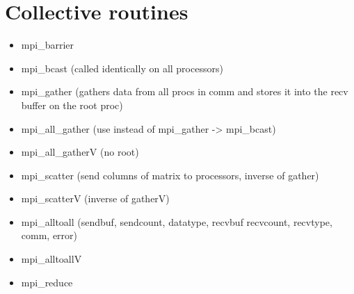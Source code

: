 \documentclass[10pt]{article}
\newenvironment{mitemize}
{
  \begin{itemize}
  \setlength{\itemsep}{1pt}
  \setlength{\parskip}{0pt}
  \setlength{\parsep}{0pt}}{\end{itemize}
}
\begin{document}
\section*{Collective routines}
\begin{mitemize}
  \item mpi\_barrier
  \item mpi\_bcast (called identically on all processors)
  \item mpi\_gather (gathers data from all procs in comm and stores it into the recv buffer on the root proc)
  \item mpi\_all\_gather (use instead of mpi\_gather -> mpi\_bcast)
  \item mpi\_all\_gatherV (no root)
  \item mpi\_scatter (send columns of matrix to processors, inverse of gather)
  \item mpi\_scatterV (inverse of gatherV)
  \item mpi\_alltoall (sendbuf, sendcount, datatype, recvbuf recvcount, recvtype, comm, error)
  \item mpi\_alltoallV
  \item mpi\_reduce
\end{mitemize}
\end{document}
